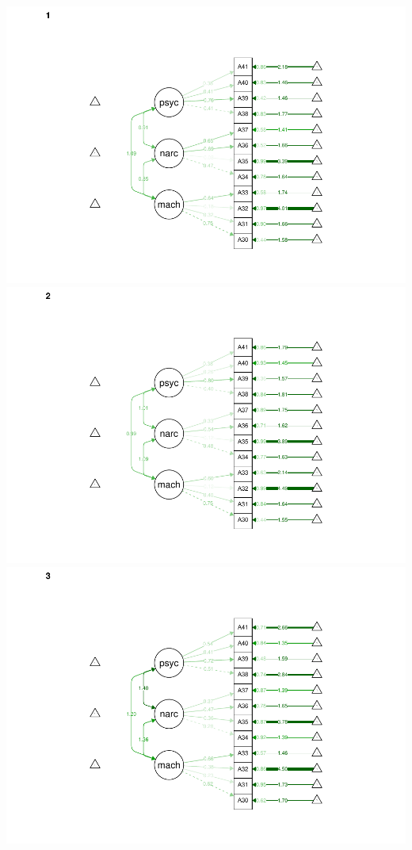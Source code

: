 \documentclass[
  english,
  man]{apa6}
\begin{document}
\includegraphics{SIOPpaper_files/figure-latex/measinv-1.pdf} \includegraphics{SIOPpaper_files/figure-latex/measinv-2.pdf} \includegraphics{SIOPpaper_files/figure-latex/measinv-3.pdf}
\end{document}

